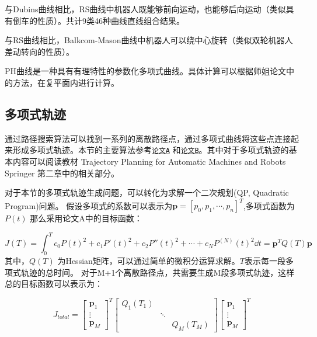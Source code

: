 与Dubins曲线相比，RS曲线中机器人既能够前向运动，也能够后向运动（类似具有倒车的性质）。共计9类46种曲线直线组合结果。


与RS曲线相比，Balkcom-Mason曲线中机器人可以绕中心旋转（类似双轮机器人差动转向的性质）。


PH曲线是一种具有有理特性的参数化多项式曲线。具体计算可以根据师姐论文中的方法，在复平面内进行计算。

\subsection{多项式轨迹}
通过路径搜索算法可以找到一系列的离散路径点，通过多项式曲线将这些点连接起来形成多项式轨迹。本节的主要算法参考\href{https://pdfs.semanticscholar.org/2376/078d13761387cabb933798b93a706c2ea7ef.pdf}{\texttt{论文A}}
和\href{http://www-personal.acfr.usyd.edu.au/spns/cdm/papers/Mellinger.pdf}{\texttt{论文B}}。其中对于多项式轨迹的基本内容可以阅读教材 Trajectory Planning for Automatic Machines and Robots Springer 第二章中的相关部分。

对于本节的多项式轨迹生成问题，可以转化为求解一个二次规划(QP, Quadratic Program)问题。
假设多项式的系数可以表示为$\bm{p} = [p_0, p_1, \cdots, p_n]^T$,多项式函数为$P(t)$ 那么采用论文A中的目标函数：

\begin{equation}
    J(T) = \int_0^T c_0 P(t)^2 + c_1 P'(t)^2 + c_2 P''(t)^2 + \cdots + c_N P^{(N)}(t)^2 \dd t = \bm{p}^T Q(T) \bm{p}
\end{equation}
其中，$Q(T)$ 为Hessian矩阵，可以通过简单的微积分运算求解。$T$表示每一段多项式轨迹的总时间。
对于M+1个离散路径点，共需要生成M段多项式轨迹，这样总的目标函数可以表示为：

\begin{equation}
J_{total} = \begin{bmatrix} \bm{p}_1 \\ \vdots \\ \bm{p}_M \end{bmatrix}^T 
 \begin{bmatrix} Q_1(T_1) & & \\ & \ddots & \\ & & Q_M(T_M) \end{bmatrix}
 \begin{bmatrix} \bm{p}_1 \\ \vdots \\ \bm{p}_M \end{bmatrix}^T 
\end{equation}


